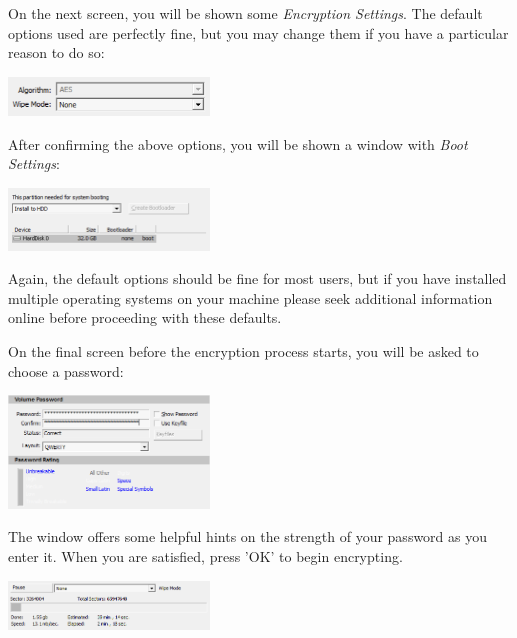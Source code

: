 \documentclass[10.5pt,a4paper]{article}
\begin{document}
\begin{multicols*}{2}
On the next screen, you will be shown some \textit{Encryption Settings}. The default options used are perfectly fine, but you may change them if you have a particular reason to do so:

\begin{center}
	\includegraphics[width=0.40\textwidth]{enc-options.png}
\end{center}

\vspace{1cm} %
After confirming the above options, you will be shown a window with \textit{Boot Settings}:

\begin{center}
	\includegraphics[width=0.40\textwidth]{boot-settings.png}
\end{center}

Again, the default options should be fine for most users, but if you have installed multiple operating systems on your machine please seek additional information online before proceeding with these defaults.

On the final screen before the encryption process starts, you will be asked to choose a password:

\begin{center}
	\includegraphics[width=0.40\textwidth]{volume-password.png}
\end{center}

The window offers some helpful hints on the strength of your password as you enter it. When you are satisfied, press 'OK' to begin encrypting.

\begin{center}
	\includegraphics[width=0.40\textwidth]{encrypting.png}
\end{center}


\end{multicols*}
\end{document}
